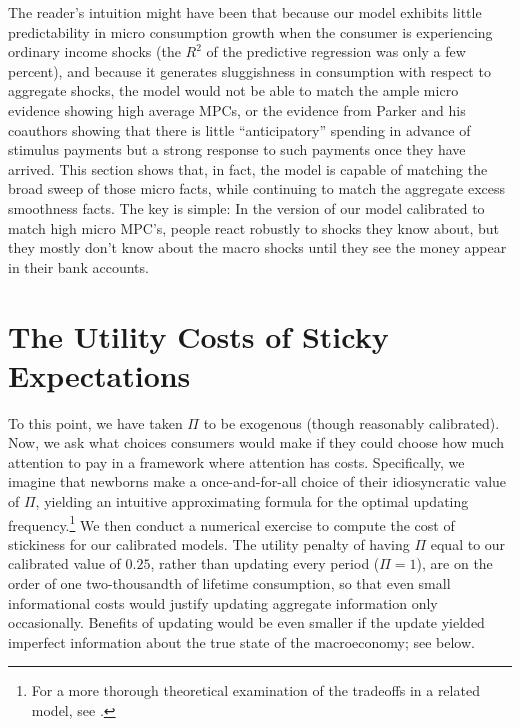 \documentclass[titlepage]{article}
\begin{document}
The reader's intuition might have been that because our model exhibits little predictability in micro consumption growth when the consumer is experiencing ordinary income shocks (the $R^{2}$ of the predictive regression was only a few percent), and because it generates sluggishness in consumption with respect to aggregate shocks, the model would not be able to match the ample micro evidence showing high average MPCs, or the evidence from Parker and his coauthors showing that there is little ``anticipatory'' spending in advance of stimulus payments but a strong response to such payments once they have arrived.  This section shows that, in fact, the model is capable of matching the broad sweep of those micro facts, while continuing to match the aggregate excess smoothness facts.  The key is simple: In the version of our model calibrated to match high micro MPC's, people react robustly to shocks they know about, but they mostly don't know about the macro shocks until they see the money appear in their bank accounts.

 
\section{The Utility Costs of Sticky Expectations}\label{sec:uCost}

To this point, we have taken $\Pi$ to be exogenous (though reasonably calibrated).  Now, we ask what choices consumers would make if they could choose how much attention to pay in a framework where attention has costs.  Specifically, we imagine that newborns make a once-and-for-all choice of their idiosyncratic value of $\Pi$, yielding an intuitive approximating formula for the optimal updating frequency.\footnote{For a more thorough theoretical examination of the tradeoffs in a related model, see \cite{reis:inattentive}.}  We then conduct a numerical exercise to compute the cost of stickiness for our calibrated models.  The utility penalty of having $\Pi$ equal to our calibrated value of $0.25$, rather than updating every period ($\Pi=1$), are on the order of one two-thousandth of lifetime consumption, so that even small informational costs would justify updating aggregate information only occasionally.  Benefits of updating would be even smaller if the update yielded imperfect information about the true state of the macroeconomy; see below.
\end{document}
